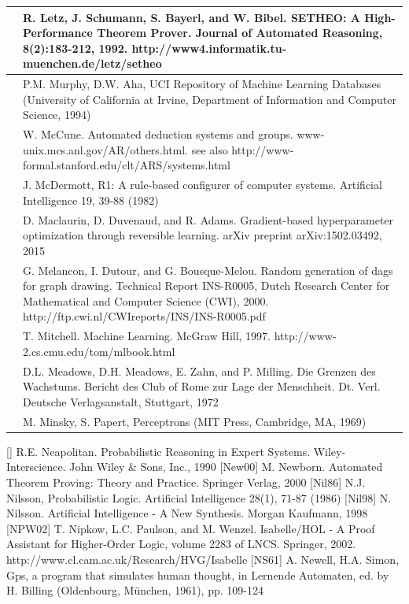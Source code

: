 \documentclass[10pt]{book}
\begin{document}
\begin{tabular}{|l|l|}
\hline [LSBB92] & R. Letz, J. Schumann, S. Bayerl, and W. Bibel. SETHEO: A High-Performance Theorem Prover. Journal of Automated Reasoning, 8(2):183-212, 1992. http://www4.informatik.tu-muenchen.de/letz/setheo \\
\hline [\cite{murphy1994uci}] & P.M. Murphy, D.W. Aha, UCI Repository of Machine Learning Databases (University of California at Irvine, Department of Information and Computer Science, 1994) \\
\hline [McC] & W. McCune. Automated deduction systems and groups. www-unix.mcs.anl.gov/AR/others.html. see also http://www-formal.stanford.edu/clt/ARS/systems.html \\
\hline [McD82] & J. McDermott, R1: A rule-based configurer of computer systems. Artificial Intelligence 19, 39-88 (1982) \\
\hline [MDA15] & D. Maclaurin, D. Duvenaud, and R. Adams. Gradient-based hyperparameter optimization through reversible learning. arXiv preprint arXiv:1502.03492, 2015 \\
\hline [MDBM00] & G. Melancon, I. Dutour, and G. Bousque-Melou. Random generation of dags for graph drawing. Technical Report INS-R0005, Dutch Research Center for Mathematical and Computer Science (CWI), 2000. http://ftp.cwi.nl/CWIreports/INS/INS-R0005.pdf \\
\hline [Mit97] & T. Mitchell. Machine Learning. McGraw Hill, 1997. http://www-2.cs.cmu.edu/tom/mlbook.html \\
\hline [MMZM72] & D.L. Meadows, D.H. Meadows, E. Zahn, and P. Milling. Die Grenzen des Wachstums. Bericht des Club of Rome zur Lage der Menschheit. Dt. Verl. Deutsche Verlagsanstalt, Stuttgart, 1972 \\
\hline [MP69] & M. Minsky, S. Papert, Perceptrons (MIT Press, Cambridge, MA, 1969) \\
\end{tabular}
[\cite{neapolitan1990probabilistic}] R.E. Neapolitan. Probabilistic Reasoning in Expert Systems. Wiley-Interscience. John Wiley \& Sons, Inc., 1990
[New00] M. Newborn. Automated Theorem Proving: Theory and Practice. Springer Verlag, 2000
[Nil86] N.J. Nilsson, Probabilistic Logic. Artificial Intelligence 28(1), 71-87 (1986)
[Nil98] N. Nilsson. Artificial Intelligence - A New Synthesis. Morgan Kaufmann, 1998
[NPW02] T. Nipkow, L.C. Paulson, and M. Wenzel. Isabelle/HOL - A Proof Assistant for Higher-Order Logic, volume 2283 of LNCS. Springer, 2002. http://www.cl.cam.ac.uk/Research/HVG/Isabelle
[NS61] A. Newell, H.A. Simon, Gps, a program that simulates human thought, in Lernende Automaten, ed. by H. Billing (Oldenbourg, München, 1961), pp. 109-124
\end{document}
